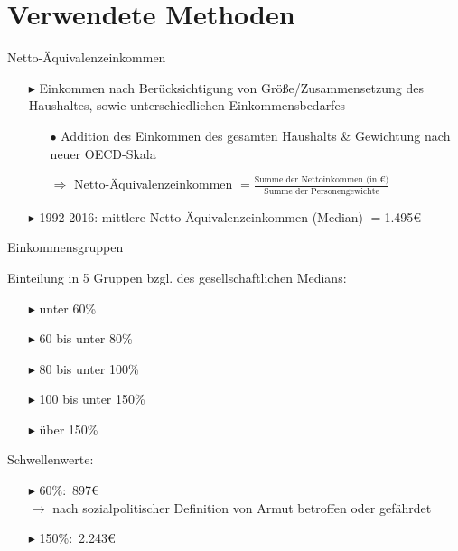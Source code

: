 \documentclass{beamer}
\begin{document}
\section{Verwendete Methoden}
\begin{frame}{Netto-Äquivalenzeinkommen}
	\begin{itemize}
		\item[$\blacktriangleright$] Einkommen nach Berücksichtigung von Größe/Zusammensetzung des Haushaltes, sowie unterschiedlichen Einkommensbedarfes
\vspace{0.3cm}		
		\begin{itemize}
		\item[$\bullet$]	Addition des Einkommen des gesamten Haushalts \& Gewichtung nach neuer OECD-Skala
\vspace{0.2cm}
		\item[$\Rightarrow$] Netto-Äquivalenzeinkommen $=\frac{\text{Summe der Nettoinkommen (in €)}}{\text{Summe der Personengewichte}}$
		\end{itemize}
\vspace{0.3cm}
		\item[$\blacktriangleright$] 1992-2016: mittlere Netto-Äquivalenzeinkommen (Median) $=$1.495€
	\end{itemize}
\end{frame}

\begin{frame}{Einkommensgruppen}
	\begin{block}{Einteilung in 5 Gruppen bzgl. des gesellschaftlichen Medians:}
		\begin{itemize}
			\item[$\blacktriangleright$] unter 60\%
			\item[$\blacktriangleright$] 60 bis unter 80\%
			\item[$\blacktriangleright$] 80 bis unter 100\%
			\item[$\blacktriangleright$] 100 bis unter 150\%
			\item[$\blacktriangleright$] über 150\%
		\end{itemize}
	\end{block}
	\begin{block}{Schwellenwerte:}
		\begin{itemize}
			\item[$\blacktriangleright$] 60\%:\, 897€ \\ $\rightarrow$ nach sozialpolitischer Definition von Armut betroffen oder gefährdet
			\item[$\blacktriangleright$] 150\%:\, 2.243€
		\end{itemize}
	\end{block}
\end{frame}
\end{document}
